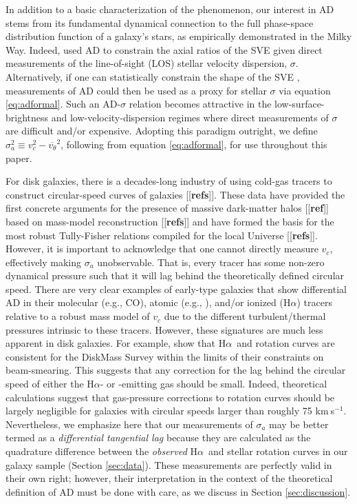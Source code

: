 \documentclass[apj,iop,revtex4,numberedappendix]{emulateapj}
\newcommand{\comment}[2][todo]{{\color{#1}[[{\bf #2}]]}}
\newcommand{\kms}{{km$~\!$s$^{-1}$}}
\newcommand{\halpha}{H$\alpha$}
\begin{document}
In addition to a basic characterization of the phenomenon, our interest
in AD stems from its fundamental dynamical connection to the full
phase-space distribution function of a galaxy's stars, as empirically
demonstrated in the Milky Way.  Indeed, \citet{2011ApJ...742...18W} used
AD to constrain the axial ratios of the SVE given direct measurements of
the line-of-sight (LOS) stellar velocity dispersion, $\sigma$.
Alternatively, if one can statistically constrain the shape of the SVE
\citep[e.g.][]{2012MNRAS.423.2726G}, measurements of AD could then be
used as a proxy for stellar $\sigma$ via equation \ref{eq:adformal}.
Such an AD-$\sigma$ relation becomes attractive in the
low-surface-brightness and low-velocity-dispersion regimes where direct
measurements of $\sigma$ are difficult and/or expensive.  Adopting this
paradigm outright, we define $\sigma_a^2 \equiv v_c^2 -
\overline{v_\theta}^2$, following from equation \ref{eq:adformal}, for
use throughout this paper.

For disk galaxies, there is a decades-long industry of using cold-gas
tracers to construct circular-speed curves of galaxies \comment{refs}.
These data have provided the first concrete arguments for the presence
of massive dark-matter halos \comment{ref} based on mass-model
reconstruction \comment{refs} and have formed the basis for the most
robust Tully-Fisher relations compiled for the local Universe
\comment{refs}.  However, it is important to acknowledge that one cannot
directly measure $v_c$, effectively making $\sigma_a$ unobservable.
That is, every tracer has some non-zero dynamical pressure such that it
will lag behind the theoretically defined circular speed.  There are
very clear examples of early-type galaxies that show differential AD in
their molecular (e.g., CO), atomic (e.g., ), and/or ionized
(\halpha) tracers relative to a robust mass model of $v_c$
\citep{2013MNRAS.429..534D} due to the different turbulent/thermal
pressures intrinsic to these tracers.  However, these signatures are
much less apparent in disk galaxies.  For example,
\citet{2013A&A...557A.131M} show that \halpha\ and  rotation
curves are consistent for the DiskMass Survey within the limits of their
constraints on beam-smearing.  This suggests that any correction for the
lag behind the circular speed of either the \halpha- or
-emitting gas should be small.  Indeed, theoretical
calculations \citet{2010ApJ...721..547D} suggest that gas-pressure
corrections to  rotation curves should be largely negligible
for galaxies with circular speeds larger than roughly 75 \kms.
Nevertheless, we emphasize here that our measurements of $\sigma_a$ may
be better termed as a {\em differential tangential lag} because they are
calculated as the quadrature difference between the {\em observed}
\halpha\ and stellar rotation curves in our galaxy sample (Section
\ref{sec:data}).  These measurements are perfectly valid in their own
right; however, their interpretation in the context of the theoretical
definition of AD must be done with care, as we discuss in Section
\ref{sec:discussion}.
\end{document}
